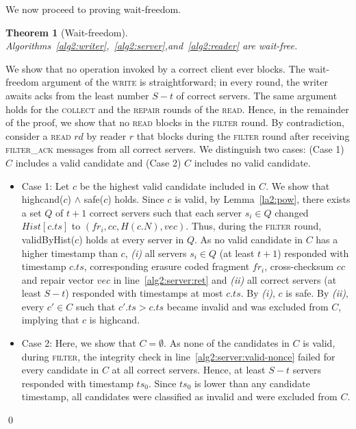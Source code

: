 \documentclass[10pt,conference,compsocconf]{IEEEtran}
\newtheorem{theo}[defn]{Theorem}
\newenvironment{prooff}{\vspace{1ex}\noindent{\bf Proof:}\hspace{0.5em}}
	{\hfill\qed\vspace{1em}}
\begin{document}
We now proceed to proving wait-freedom.
\begin{theo}[Wait-freedom] Algorithms~\ref{alg2:writer},~\ref{alg2:server},and~\ref{alg2:reader} are wait-free.
\end{theo}
\begin{prooff} We show that no operation invoked by a correct client ever blocks. The wait-freedom argument of the \textsc{write} is straightforward; in every round, the writer awaits acks from the least number $S-t$ of correct servers. The same argument holds for the \textsc{collect} and the \textsc{repair} rounds of the \textsc{read}. Hence, in the remainder of the proof, we show that no \textsc{read} blocks in the \textsc{filter} round. By contradiction, consider a \textsc{read} $rd$ by reader $r$ that blocks during the \textsc{filter} round after receiving \textsc{filter\_ack} messages from all correct servers. We distinguish two cases: (Case 1) $C$ includes a valid candidate and (Case 2) $C$ includes no valid candidate.

\begin{itemize}
\item Case 1: Let $c$ be the highest valid candidate included in $C$. We show that \textsf{highcand}($c$) $\wedge$ \textsf{safe}($c$) holds. Since $c$ is valid, by Lemma~\ref{la2:pow}, there exists a set $Q$ of $t+1$ correct servers such that each server $s_i \in Q$ changed $Hist[c.ts]$ to $(fr_i,cc,H(c.N),vec)$. Thus, during the \textsc{filter} round, \textsf{validByHist}($c$) holds at every server in $Q$. As no valid candidate in $C$ has a higher timestamp than $c$, \textit{(i)} all servers $s_i \in Q$ (at least $t+1$) responded with timestamp $c.ts$, corresponding erasure coded fragment $fr_i$, cross-checksum $cc$ and repair vector $vec$ in line~\ref{alg2:server:ret} and \textit{(ii)} all correct servers (at least $S-t$) responded with timestamps at most $c.ts$. By \emph{(i)}, $c$ is \textsf{safe}. By \emph{(ii)}, every $c' \in C$ such that $c'.ts > c.ts$ became \textsf{invalid} and was excluded from $C$, implying that $c$ is \textsf{highcand}.

\item Case 2: Here, we show that $C = \emptyset$. As none of the candidates in $C$ is valid, during \textsc{filter}, the integrity check in line~\ref{alg2:server:valid-nonce} failed for every candidate in $C$ at all correct servers. Hence, at least $S-t$ servers responded with timestamp $ts_0$. Since $ts_0$ is lower than any candidate timestamp, all candidates were classified as \textsf{invalid} and were excluded from $C$.
\end{itemize}
\end{prooff}
\end{document}
